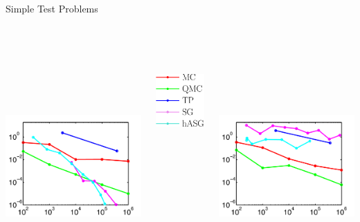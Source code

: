 \documentclass[final]{beamer}
\begin{document}
\begin{frame}{}
{\begin{columns}[t]
\begin{column}{.30\linewidth}
\begin{block}{\centering Simple Test Problems}
\begin{columns}[T]
\begin{column}{12cm}{}
\includegraphics[height=10cm, width = 14cm]{figures/gaussian5errors}\\
\end{column}
\begin{column}{4cm}{}
\vspace{2cm}
\centering\includegraphics[height=5cm,width=5cm]{figures/legend}\\
\end{column}
\begin{column}{14cm}{}
\includegraphics[height=10cm, width = 14cm]{figures/maxgaussian5errors}\\

\end{column}
\end{columns}
\end{block}
\end{column}
\end{columns}}
\end{frame}
\end{document}

